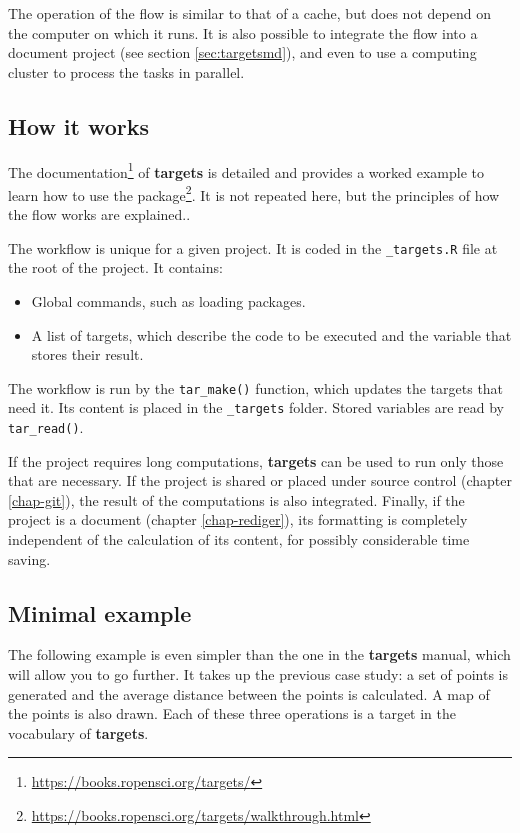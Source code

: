 \documentclass[
  12pt,
  american,
  a4paper,
  extrafontsizes,onecolumn,openright
  ]{memoir}
\providecommand{\tightlist}{%
  \setlength{\itemsep}{0pt}\setlength{\parskip}{0pt}}
\begin{document}
The operation of the flow is similar to that of a cache, but does not depend on the computer on which it runs.
It is also possible to integrate the flow into a document project (see section \ref{sec:targetsmd}), and even to use a computing cluster to process the tasks in parallel.

\subsection{How it works}\label{how-it-works-1}

The documentation\footnote{\url{https://books.ropensci.org/targets/}} of \textbf{targets} is detailed and provides a worked example to learn how to use the package\footnote{\url{https://books.ropensci.org/targets/walkthrough.html}}.
It is not repeated here, but the principles of how the flow works are explained..

The workflow is unique for a given project.
It is coded in the \texttt{\_targets.R} file at the root of the project.
It contains:

\begin{itemize}
\tightlist
\item
  Global commands, such as loading packages.
\item
  A list of targets, which describe the code to be executed and the variable that stores their result.
\end{itemize}

The workflow is run by the \texttt{tar\_make()} function, which updates the targets that need it.
Its content is placed in the \texttt{\_targets} folder.
Stored variables are read by \texttt{tar\_read()}.

If the project requires long computations, \textbf{targets} can be used to run only those that are necessary.
If the project is shared or placed under source control (chapter \ref{chap-git}), the result of the computations is also integrated.
Finally, if the project is a document (chapter \ref{chap-rediger}), its formatting is completely independent of the calculation of its content, for possibly considerable time saving.

\subsection{Minimal example}\label{minimal-example}

The following example is even simpler than the one in the \textbf{targets} manual, which will allow you to go further.
It takes up the previous case study: a set of points is generated and the average distance between the points is calculated.
A map of the points is also drawn.
Each of these three operations is a target in the vocabulary of \textbf{targets}.
\end{document}
